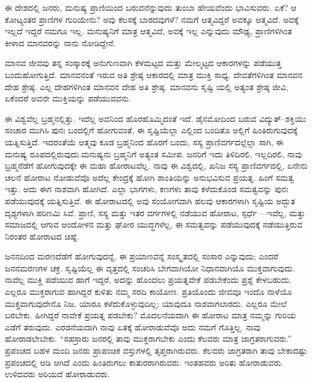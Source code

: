 ಈ ದೇಶದಲ್ಲಿ ಜನರು, ಮನುಷ್ಯ ಪ್ರಾಣಿಯಿಂದ ಬರುವನೆನ್ನುವುದು ತುಂಬಾ ಹೇಯವೆಂದು ಭಾವಿಸುವರು. ಏಕೆ? ಆ ಕೋಟ್ಯಂತರ ಪ್ರಾಣಿಗಳ ಗುರಿಯೇನು? ಅವು ಕೆಲಸಕ್ಕೆ ಬಾರದವುಗಳೆ? ನಮಗೆ ಆತ್ಮವಿದ್ದರೆ ಅವಕ್ಕೂ ಆತ್ಮವಿದೆ. ಅವಕ್ಕೆ ಇಲ್ಲದೆ ಇದ್ದರೆ ನಮಗೂ ಇಲ್ಲ. ಮನುಷ್ಯನಿಗೆ ಮಾತ್ರ ಆತ್ಮವಿದೆ, ಅವಕ್ಕೆ ಇಲ್ಲ ಎನ್ನುವುದು ಮೌಢ್ಯ, ಪ್ರಾಣಿಗಳಿಗಿಂತ ಕೀಳಾದ ಮಾನವರನ್ನು ನಾನು ನೋಡಿದ್ದೇನೆ.

ಮಾನವ ಜೀವವು ತನ್ನ ಸಂಸ್ಕಾರಕ್ಕೆ ಅನುಗುಣವಾಗಿ ಕೆಳಮಟ್ಟದ ಮತ್ತು ಮೇಲ್ಮಟ್ಟದ ಆಕಾರಗಳನ್ನು ಪಡೆಯುತ್ತ ಬಂದುಹೋಗುತ್ತಿದೆ. ಮಾನವನಂತೆ ಇರುವ ಅತಿ ಶ್ರೇಷ್ಠ ಆಕಾರದಲ್ಲಿ ಮಾತ್ರ ಮುಕ್ತಿ ಸಾಧ್ಯ. ದೇವತೆಗಳಿಗಿಂತ ಮಾನವನ ದೇಹ ಶ್ರೇಷ್ಠ. ಎಲ್ಲ ದೇಹಗಳಿಗಿಂತ ಮಾನವನ ದೇಹ ಅತಿ ಶ್ರೇಷ್ಠ. ಮಾನವನು ಸೃಷ್ಟಿ ಯಲ್ಲಿ ಅತ್ಯಂತ ಶ್ರೇಷ್ಠ ಜೀವಿ, ಏಕೆಂದರೆ ಅವನೇ ಮುಕ್ತಿಯನ್ನು ಪಡೆಯುವವನು.

ಈ ವಿಶ್ವವೆಲ್ಲ ಬ್ರಹ್ಮನಲ್ಲಿತ್ತು. ಇದೆಲ್ಲ ಅವನಿಂದ ಹೊರಹೊಮ್ಮಿದಂತೆ ಇದೆ. ಡೈನಮೋದಿಂದ ಬರುವ ವಿದ್ಯುತ್​–ಶಕ್ತಿಯು ಸಂಚಾರ ಮುಗಿಸಿ ಪುನಃ ಬಂದಲ್ಲಿಗೆ ಹೋಗುವಂತೆ, ಈ ಸೃಷ್ಟಿಯೆಲ್ಲಾ ಎಲ್ಲಿಂದ ಬಂದಿತೊ ಅಲ್ಲಿಗೆ ಹಿಂತಿರುಗುವುದಕ್ಕೆ ಯತ್ನಿಸುತ್ತಿದೆ. ಇದರಂತೆಯೆ ಆತ್ಮವು ಕೂಡ ಬ್ರಹ್ಮನಿಂದ ಹೊರಗೆ ಬಂದು, ಸಸ್ಯ ಪ್ರಾಣಿವರ್ಗದಲ್ಲೆಲ್ಲಾ ಸಾಗಿ, ಈ ಮನುಷ್ಯ ರೂಪದಲ್ಲಿರುವುದು.ಮನುಷ್ಯನು ಬ್ರಹ್ಮನಿಗೆ ಅತ್ಯಂತ ಸಮೀಪ. ಜನರಿಗೆ ಇದು ತಿಳಿದಿರಲಿ, ಇಲ್ಲದಿರಲಿ, ನಾವು ಬ್ರಹ್ಮನೆಡೆಗೆ ಹೋಗುವುದಕ್ಕೇ ಈ ಮಹಾ ಹೋರಾಟವೆಲ್ಲ. ನಾವು ಈ ವಿಶ್ವದಲ್ಲಿ, ಖನಿಜ ಸಸ್ಯ ಪ್ರಾಣಿವರ್ಗದಲ್ಲಿ, ಏನೇನು ಚಲನೆ ಹೋರಾಟ ನೋಡುವೆವೊ ಅದೆಲ್ಲ ಕೇಂದ್ರಕ್ಕೆ ಹೋಗಿ ಶಾಂತಿಯನ್ನು ಅನುಭವಿಸುವ ಪ್ರಯತ್ನ. ಹಿಂಗೆ ಸಮತ್ವ ಇತ್ತು. ಅದು ಈಗ ನಾಶವಾಗಿ ಹೋಗಿದೆ. ಎಲ್ಲಾ ಭಾಗಗಳು, ಕಣಗಳು ತಾವು ಕಳೆದುಕೊಂಡ ಸಮತ್ವವನ್ನು ಪುನಃ ಪಡೆಯುವುದಕ್ಕೆ ಯತ್ನಿಸುತ್ತಿವೆ. ಈ ಹೋರಾಟದಲ್ಲಿ ಅವು ಸಂಯೋಗವಾಗಿ ಹಲವು ಆಕಾರಗಳಾಗಿ ಸೃಷ್ಟಿಯ ಅದ್ಭುತ ದೃಶ್ಯಗಳಾಗಿ ಪರಿಣಮಿ ಸಿವೆ. ಪ್ರಾಣಿ, ಸಸ್ಯ ಮತ್ತು ಇತರ ವರ್ಗಗಳಲ್ಲಿ ನಡೆಯುವ ಹೋರಾಟ, ಸ್ಪರ್ಧೆ – ಇವೆಲ್ಲ, ಮತ್ತು ಸಮಾಜದಲ್ಲಿ ಆಗುವ ಆಂದೋಳನ ಮತ್ತು ಘೋರ ಯುದ್ಧಗಳೆಲ್ಲ, ಈ ಸಮತ್ವವನ್ನು ಪಡೆಯುವುದಕ್ಕೆ ನಡೆಯುತ್ತಿರುವ ನಿರಂತರ ಹೋರಾಟದ ಚಿಹ್ನೆ.

ಜನನದಿಂದ ಮರಣದೆಡೆಗೆ ಹೋಗುವುದನ್ನೆ, ಈ ಪ್ರಯಾಣವನ್ನೆ ಸಂಸ್ಕೃತದಲ್ಲಿ ಸಂಸಾರ ಎನ್ನುವುದು; ಎಂದರೆ ಜನನಮರಣಗಳ ಚಕ್ರ. ಸೃಷ್ಟಿಯೆಲ್ಲ ಈ ವೃತ್ತದಲ್ಲಿ ಸಂಚರಿಸಿ ಬೇಗವಾಗಿಯೋ ನಿಧಾನವಾಗಿಯೊ ಮುಕ್ತವಾಗುವುದು. ನಾವೆಲ್ಲ ಮುಕ್ತಿ ಪಡೆಯುವ ಹಾಗೆ ಇದ್ದರೆ, ಅದನ್ನು ಹೊಂದಲು ಪ್ರಯತ್ನವೇಕೆ ಪಡಬೇಕೆಂದು ಪ್ರಶ್ನೆ ಕೇಳಬಹುದು. ಎಲ್ಲರೂ ಮುಕ್ತರಾಗುವ ಹಾಗಿದ್ದರೆ ಕುಳಿತು ನಮ್ಮ ಸರದಿ ಕಾಯೋಣ. ಪ್ರತಿಯೊಂದು ಜೀವವೂ ಇಂದೊ ನಾಳೆಯೊ ಮುಕ್ತವಾಗುವುದೇನೊ ನಿಜ. ಯಾರೂ ಕಳೆದುಕೊಳ್ಳುವುದಿಲ್ಲ; ಯಾವುದೂ ನಾಶವಾಗಲಾರದು. ಎಲ್ಲರೂ ಮೇಲೆ ಬರಬೇಕು. ಹೀಗಿದ್ದರೆ ನಾವೇಕೆ ಪ್ರಯತ್ನ ಪಡಬೇಕು? ಮೊದಲನೆಯದಾಗಿ ಈ ಹೋರಾಟ ಮಾತ್ರ ನಮ್ಮನ್ನು ಗುರಿಯ ಎಡೆಗೆ ತರುವುದು. ಎರಡನೆಯದಾಗಿ ನಾವು ಏತಕ್ಕೆ ಹೋರಾಡುವೆವೊ ಅದು ನಮಗೆ ಗೊತ್ತಿಲ್ಲ. ನಾವು ಹೋರಾಡಲೇಬೇಕು. “ಸಹಸ್ರಾರು ಜನರಲ್ಲಿ ತಾವು ಮುಕ್ತರಾಗಬೇಕು ಎಂದು ಕೆಲವರು ಮಾತ್ರ ಜಾಗ್ರತರಾಗುವರು.” ಪ್ರಪಂಚದ ಬಹಳ ಮಂದಿ ಜನರು ಪ್ರಾಪಂಚಿಕ ವಸ್ತುಗಳಲ್ಲಿ ತೃಪ್ತರಾಗಿರುವರು. ಕೆಲವರು ಜಾಗ್ರತರಾಗಿ ತಾವು ಬೇಕಾದಷ್ಟು ಪ್ರಪಂಚದಲ್ಲಿ ಆಡಿ ಆಗಿದೆ ಎಂದು ಹಿಂತಿರುಗಲು ಕಾತುರರಾಗಿರುವರು. ಇಂತಹವರು ಅರಿತು ಹೋರಾಡುವರು. ಉಳಿದವರು ಅರಿಯದೆ ಹೋರಾಡುವರು.

